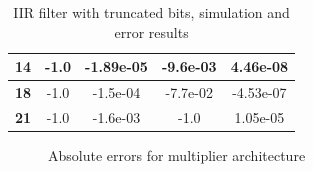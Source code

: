 \documentclass[a4paper]{article}
\begin{document}
\begin{table}[hbtp]
\begin{tabular}{|c|c|c|c|c|}
		\textbf{14}                                                                                    & -1.0                                                                            & -1.89e-05                                                                        & -9.6e-03                                                                       & 4.46e-08                                                                        \\ \hline
		\textbf{18}                                                                                    & -1.0                                                                            & -1.5e-04                                                                         & -7.7e-02                                                                       & -4.53e-07                                                                       \\ \hline
		\textbf{21}                                                                                    & -1.0                                                                            & -1.6e-03                                                                         & -1.0                                                                           & 1.05e-05                                                                        \\ \hline
		\end{tabular}
		\caption{IIR filter with truncated bits, simulation and error results}
		\label{tab:iir_trunc_sim}
	\end{table}

	\begin{figure}[H]
			\centering
			\hfill
			\caption{Absolute errors for multiplier architecture}
		\end{figure}
\end{document}
